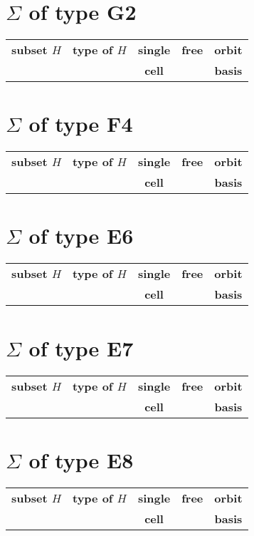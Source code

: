 \documentclass{article}
\newcommand{\resulttable}[1]{
  \section*{\(\Sigma\) of type #1}
\begin{longtable}{llccc}
  \toprule
    \textbf{subset \(H\)} & \textbf{type of \(H\)} & \textbf{single} & \textbf{free} & \textbf{orbit} \\
                  &               &   \textbf{cell}   &                & \textbf{basis} \\
  \midrule
  
  \bottomrule
\end{longtable}
}
\begin{document}
\resulttable{G2}
\resulttable{F4}\newpage
\resulttable{E6}\newpage
\resulttable{E7}\newpage
\resulttable{E8}
\end{document}
